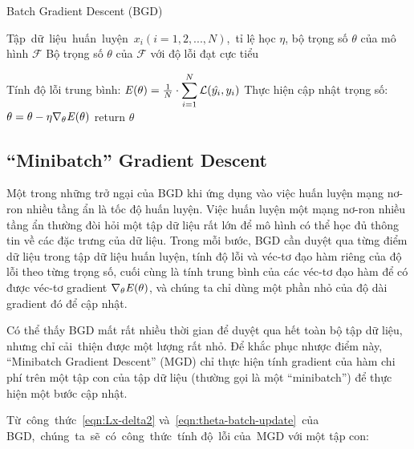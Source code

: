 \begin{algorithm}
	\caption{Batch Gradient Descent (BGD)} \label{alg:BGD}
	\begin{algorithmic}[1]
		\renewcommand{\algorithmicrequire}{\textbf{Đầu vào:}}
		\renewcommand{\algorithmicensure}{\textbf{Đầu ra:}}
		\algnewcommand{}
		\algnewcommand\Operation{\item[\algorithmicoperation]}

		\Require Tập dữ liệu huấn luyện $x_i (i = 1, 2, ..., N)$, tỉ lệ học $\eta$, bộ trọng số $\theta$ của mô hình $\mathcal{F}$
		\Ensure Bộ trọng số $\theta$ của $\mathcal{F}$ với độ lỗi đạt cực tiểu

		\Operation
			\State Tính độ lỗi trung bình: $\mathbf{\it{E}(\theta)} = \frac{1}{N}\cdot \displaystyle\sum_{i=1}^{N}\mathcal{L}(\hat{y_i}, y_i)$
			\State Thực hiện cập nhật trọng số: $\theta = \theta - \eta \nabla_{\theta} \mathbf{\it{E}(\theta)}$
		\EndWhile
		\State return $\theta$
	\end{algorithmic}
\end{algorithm}

\subsection{``Minibatch'' Gradient Descent}

Một trong những trở ngại của BGD khi ứng dụng vào việc huấn luyện mạng nơ-ron nhiều tầng ẩn là tốc độ huấn luyện. Việc huấn luyện một mạng nơ-ron nhiều tầng ẩn thường đòi hỏi một tập dữ liệu rất lớn để mô hình có thể học đủ thông tin về các đặc trưng của dữ liệu. Trong mỗi bước, BGD cần duyệt qua từng điểm dữ liệu trong tập dữ liệu huấn luyện, tính độ lỗi và véc-tơ đạo hàm riêng của độ lỗi theo từng trọng số, cuối cùng là tính trung bình của các véc-tơ đạo hàm để có được véc-tơ gradient $\nabla_{\theta}\mathbf{\it{E}}(\theta)$, và chúng ta chỉ dùng một phần nhỏ của độ dài gradient đó để cập nhật.

Có thể thấy BGD mất rất nhiều thời gian để duyệt qua hết toàn bộ tập dữ liệu, nhưng chỉ cải thiện được một lượng rất nhỏ. Để khắc phục nhược điểm này, ``Minibatch Gradient Descent'' (MGD) chỉ thực hiện tính gradient của hàm chi phí trên một tập con của tập dữ liệu (thường gọi là một ``minibatch'') để thực hiện một bước cập nhật.

Từ công thức \ref{eqn:Lx-delta2} và \ref{eqn:theta-batch-update} của BGD, chúng ta sẽ có công thức tính độ lỗi của MGD với một tập con:

